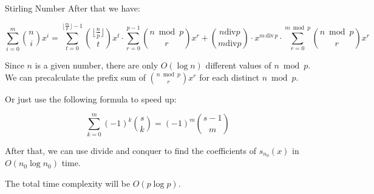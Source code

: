\begin{tutorial}{Stirling Number}
After that we have:

$$
\sum\limits_{i=0}^{m}\binom{n}{i}x^i=\sum_{t=0}^{\lfloor\frac{m}{p}\rfloor-1}\binom{\lfloor\frac{n}{p}\rfloor}{t}x^t \cdot \sum_{r=0}^{p-1}\binom{n \bmod p}{r}x^r+\binom{n \mathbin{\mathrm{div}} p}{m \mathbin{\mathrm{div}} p} \cdot x^{m \mathbin{\,\mathrm{div}\,} p} \cdot \sum_{r=0}^{m \bmod p}\binom{n \bmod p}{r}x^r
$$

Since $n$ is a given number, there are only $O(\log n)$ different values of $n \bmod p$. We can precalculate the prefix sum of $\binom{n \bmod p}{r} x^r$ for each distinct $n \bmod p$.

Or just use the following formula to speed up:

$$
\sum_{k=0}^{m}(-1)^k \binom{s}{k}=(-1)^m \binom{s-1}{m}
$$

After that, we can use divide and conquer to find the coefficients of $s_{n_0}(x)$ in $O(n_0 \log n_0)$ time.

The total time complexity will be $O(p \log p)$.

\end{tutorial}
